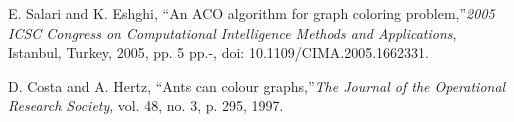 \documentclass[a4paper]{article}
\begin{document}
\newpage
\begin{thebibliography}{2}

     E. Salari and K. Eshghi, ``An ACO algorithm for graph coloring problem,''\textit{2005 ICSC Congress on Computational Intelligence Methods and Applications}, Istanbul, Turkey, 2005, pp. 5 pp.-, doi: 10.1109/CIMA.2005.1662331.
    
     D. Costa and A. Hertz, ``Ants can colour graphs,''\textit{The Journal of the Operational Research Society}, vol. 48, no. 3, p. 295, 1997. 
    
\end{thebibliography}
\end{document}
